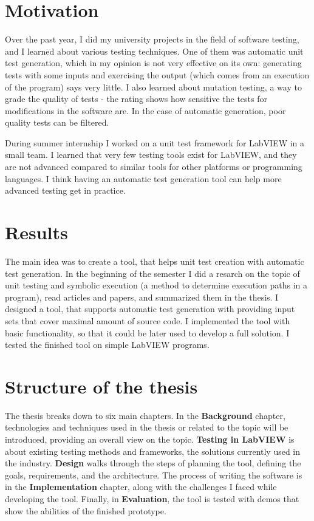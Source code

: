 \section{Motivation}
Over the past year, I did my university projects in the field of software testing, and I learned about various testing techniques. One of them was automatic unit test generation, which in my opinion is not very effective on its own: generating tests with some inputs and exercising the output (which comes from an execution of the program) says very little. I also learned about mutation testing, a way to grade the quality of tests - the rating shows how sensitive the tests for modifications in the software are. In the case of automatic generation, poor quality tests can be filtered.

During summer internship I worked on a unit test framework for LabVIEW in a small team. I learned that very few testing tools exist for LabVIEW, and they are not advanced compared to similar tools for other platforms or programming languages. I think having an automatic test generation tool can help more advanced testing get in practice.


\section{Results}
The main idea was to create a tool, that helps unit test creation with automatic test generation. In the beginning of the semester I did a resarch on the topic of unit testing and symbolic execution (a method to determine execution paths in a program), read articles and papers, and summarized them in the thesis. I designed a tool, that supports automatic test generation with providing input sets that cover maximal amount of source code. I implemented the tool with basic functionality, so that it could be later used to develop a full solution. I tested the finished tool on simple LabVIEW programs.
\section{Structure of the thesis}
The thesis breaks down to six main chapters. In the \textbf{Background} chapter, technologies and techniques used in the thesis or related to the topic will be introduced, providing an overall view on the topic. \textbf{Testing in LabVIEW} is about existing testing methods and frameworks, the solutions currently used in the industry. \textbf{Design} walks through the steps of planning the tool, defining the goals, requirements, and the architecture. The process of writing the software is in the \textbf{Implementation} chapter, along with the challenges I faced while developing the tool. Finally, in \textbf{Evaluation}, the tool is tested with demos that show the abilities of the finished prototype.
\pagebreak
